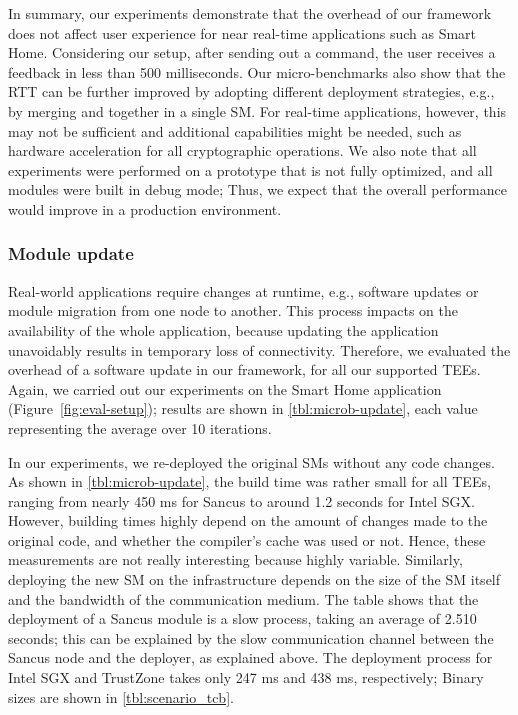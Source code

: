 In summary, our experiments demonstrate that the overhead of our framework does
not affect user experience for near real-time applications such as Smart Home.
Considering our setup, after sending out a command, the user receives a feedback
in less than 500 milliseconds. Our micro-benchmarks also show that the \ac{RTT}
can be further improved by adopting different deployment strategies, e.g., by
merging \web{} and \gateway{} together in a single \ac{SM}. For real-time
applications, however, this may not be sufficient and additional capabilities
might be needed, such as hardware acceleration for all cryptographic operations.
We also note that all experiments were performed on a prototype that is not
fully optimized, and all modules were built in debug mode; Thus, we expect that
the overall performance would improve in a production environment.

\subsubsection{Module update}
\label{eval:microb-update}



Real-world applications require changes at runtime, e.g., software updates or
module migration from one node to another. This process impacts on the
availability of the whole application, because updating the application
unavoidably results in temporary loss of connectivity. Therefore, we evaluated
the overhead of a software update in our framework, for all our supported
\acp{TEE}. Again, we carried out our experiments on the Smart Home application
(Figure~\ref{fig:eval-setup}); results are shown in \cref{tbl:microb-update},
each value representing the average over 10 iterations.

In our experiments, we re-deployed the original \acp{SM} without any code
changes. As shown in \cref{tbl:microb-update}, the build time was rather small
for all \acp{TEE}, ranging from nearly 450 ms for Sancus to around 1.2 seconds
for Intel \ac{SGX}. However, building times highly depend on the amount of
changes made to the original code, and whether the compiler's cache was used or
not. Hence, these measurements are not really interesting because highly
variable. Similarly, deploying the new \ac{SM} on the infrastructure depends on
the size of the \ac{SM} itself and the bandwidth of the communication medium.
The table shows that the deployment of a Sancus module is a slow process, taking
an average of 2.510 seconds; this can be explained by the slow communication
channel between the Sancus node and the deployer, as explained above. The
deployment process for Intel \ac{SGX} and TrustZone takes only 247 ms and 438
ms, respectively; Binary sizes are shown in \cref{tbl:scenario_tcb}.

